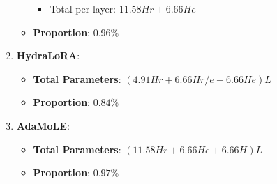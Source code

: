 \begin{enumerate}
\begin{itemize}
\begin{itemize}
            \item Total per layer: \( 11.58Hr + 6.66He \)
        \end{itemize}
        \item \textbf{Proportion}: \( 0.96\% \)
    \end{itemize}
    \item \textbf{HydraLoRA}:
    \begin{itemize}
        \item \textbf{Total Parameters}: \( (4.91Hr + 6.66Hr/e + 6.66He)L \)
        \item \textbf{Proportion}: \( 0.84\% \)
    \end{itemize}
    \item \textbf{AdaMoLE}:
    \begin{itemize}
        \item \textbf{Total Parameters}: \( (11.58Hr + 6.66He + 6.66H)L \)
        \item \textbf{Proportion}: \( 0.97\% \)
    \end{itemize}
\end{enumerate}






